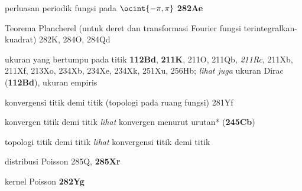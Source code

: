 







perluasan periodik fungsi pada $\ocint{-\pi,\pi}$ {\bf 282Ae}






































Teorema Plancherel (untuk deret dan transformasi Fourier fungsi terintegralkan-kuadrat) 282K, 284O, 284Qd















ukuran yang bertumpu pada titik {\bf 112Bd},
  {\bf 211K}, 211O, 211Qb, {\it 211Rc}, 211Xb, 211Xf, 213Xo,
234Xb, 234Xe, 234Xk, 251Xu, 256Hb;
  {\it lihat juga} ukuran Dirac ({\bf 112Bd}), ukuran empiris




konvergensi titik demi titik (topologi pada ruang fungsi)
281Yf






konvergen titik demi titik 
  {\it lihat} konvergen menurut urutan* ({\bf 245Cb})


topologi titik demi titik {\it lihat} konvergensi titik demi titik


distribusi Poisson 285Q, {\bf 285Xr}


kernel Poisson {\bf 282Yg}




